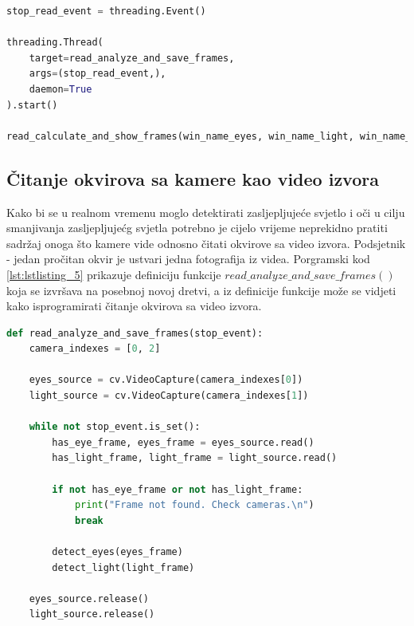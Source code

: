 \documentclass{foi}
\begin{document}
\begin{lstlisting}[language=Python, label={lst:lstlisting_4}, firstnumber=151, style=colored, caption={Inicijaliziranje dretvenog događaja $stop\_read\_event$, stvaranje i pokretanje nove dretve i pozivanje funkcije $read\_analyze\_and\_save\_frames()$ u glavnoj dretvi}]
stop_read_event = threading.Event()

threading.Thread(
    target=read_analyze_and_save_frames,
    args=(stop_read_event,),
    daemon=True
).start()

read_calculate_and_show_frames(win_name_eyes, win_name_light, win_name_protection)
\end{lstlisting}

\subsection{Čitanje okvirova sa kamere kao video izvora}

Kako bi se u realnom vremenu moglo detektirati zasljepljujeće svjetlo i oči u cilju smanjivanja zasljepljujećg svjetla potrebno je cijelo vrijeme neprekidno pratiti sadržaj onoga što kamere vide odnosno čitati okvirove sa video izvora. Podsjetnik - jedan pročitan okvir je ustvari jedna fotografija iz videa. Porgramski kod \ref{lst:lstlisting_5} prikazuje definiciju funkcije $read\_analyze\_and\_save\_frames()$ koja se izvršava na posebnoj novoj dretvi, a iz definicije funkcije može se vidjeti kako isprogramirati čitanje okvirova sa video izvora.

\begin{lstlisting}[language=Python, label={lst:lstlisting_5}, firstnumber=13, style=colored, caption={Definicija funkcije $read\_analyze\_and\_save\_frames()$}]
def read_analyze_and_save_frames(stop_event):
    camera_indexes = [0, 2]

    eyes_source = cv.VideoCapture(camera_indexes[0])
    light_source = cv.VideoCapture(camera_indexes[1])

    while not stop_event.is_set():
        has_eye_frame, eyes_frame = eyes_source.read()
        has_light_frame, light_frame = light_source.read()

        if not has_eye_frame or not has_light_frame:
            print("Frame not found. Check cameras.\n")
            break

        detect_eyes(eyes_frame)
        detect_light(light_frame)

    eyes_source.release()
    light_source.release()
\end{lstlisting}
\end{document}
